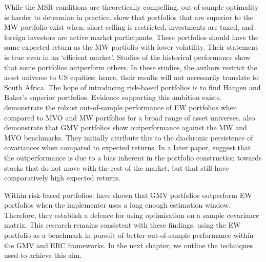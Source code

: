 \documentclass[
]{article}
\begin{document}
While the MSR conditions are theoretically compelling, out-of-sample optimality is harder to determine in practice. \cite{H91} show that portfolios that are superior to the MW portfolio exist when: short-selling is restricted, investments are taxed, and foreign investors are active market participants. These portfolios should have the same expected return as the MW portfolio with lower volatility. Their statement is true even in an `efficient market'. Studies of the historical performance show that some portfolios outperform others. In these studies, the authors restrict the asset universe to US equities; hence, their results will not necessarily translate to South Africa. The hope of introducing risk-based portfolios is to find Haugen and Baker's superior portfolios. Evidence supporting this ambition exists. \cite{DGL07} demonstrate the robust out-of-sample performance of EW portfolios when compared to MVO and MW portfolios for a broad range of asset universes. \cite{C06} also demonstrate that GMV portfolios show outperformance against the MW and MVO benchmarks. They initially attribute this to the diachronic persistence of covariances when compared to expected returns. In a later paper, \cite{C11} suggest that the outperformance is due to a bias inherent in the portfolio construction towards stocks that do not move with the rest of the market, but that still have comparatively high expected returns.

Within risk-based portfolios, \cite{K10} have shown that GMV portfolios outperform EW portfolios when the implementer uses a long enough estimation window. Therefore, they establish a defence for using optimisation on a sample covariance matrix. This research remains consistent with these findings, using the EW portfolio as a benchmark in pursuit of better out-of-sample performance within the GMV and ERC frameworks. In the next chapter, we outline the techniques used to achieve this aim.

  
\end{document}
